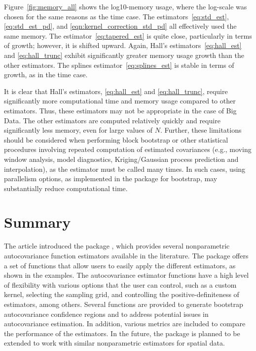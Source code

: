 Figure~\ref{fig:memory_all} shows the log10-memory usage, where the
log-scale was chosen for the same reasons as the time case. The
estimators~\eqref{eq:std_est}, \eqref{eq:std_est_pd}, and
\eqref{eqn:kernel_correction_std_pd} all effectively used the same
memory. The estimator~\eqref{eq:tapered_est} is quite close,
particularly in terms of growth; however, it is shifted upward. Again,
Hall's estimators~\eqref{eq:hall_est} and \eqref{eq:hall_trunc} exhibit
significantly greater memory usage growth than the other estimators. The
splines estimator~\eqref{eq:splines_est} is stable in terms of growth,
as in the time case.

It is clear that Hall's estimators, \eqref{eq:hall_est} and
\eqref{eq:hall_trunc}, require significantly more computational time and
memory usage compared to other estimators. Thus, these estimators may
not be appropriate in the case of Big Data. The other estimators are
computed relatively quickly and require significantly less memory, even
for large values of \(N.\) Further, these limitations should be
considered when performing block bootstrap or other statistical
procedures involving repeated computation of estimated covariances
(e.g., moving window analysis, model diagnostics, Kriging/Gaussian
process prediction and interpolation), as the estimator must be called
many times. In such cases, using parallelism options, as implemented in
the package for bootstrap, may substantially reduce computational time.

\section{Summary}\label{summary}

The article introduced the package , which provides
several nonparametric autocovariance function estimators available in
the literature. The package offers a set of functions that allow users
to easily apply the different estimators, as shown in the examples. The
autocovariance estimator functions have a high level of flexibility with
various options that the user can control, such as a custom kernel,
selecting the sampling grid, and controlling the positive-definiteness
of estimators, among others. Several functions are provided to generate
bootstrap autocovariance confidence regions and to address potential
issues in autocovariance estimation. In addition, various metrics are
included to compare the performance of the estimators. In the future,
the package is planned to be extended to work with similar nonparametric
estimators for spatial data.

